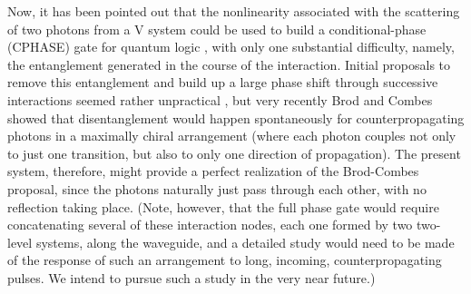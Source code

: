 \documentclass[aps,pra,twocolumn,floatfix,superscriptaddress]{revtex4}
\begin{document}
Now, it has been pointed out that the nonlinearity associated with the scattering of two photons from a V system could be used to build a conditional-phase (CPHASE) gate for quantum logic \cite{chudziki}, with only one substantial difficulty, namely, the entanglement generated in the course of the interaction.  Initial proposals to remove this entanglement and build up a large phase shift through successive interactions seemed rather unpractical \cite{chudziki}, but very recently Brod and Combes \cite{brod2,brod2} showed that disentanglement would happen spontaneously for counterpropagating photons in a maximally chiral arrangement (where each photon couples not only to just one transition, but also to only one direction of propagation).  The present system, therefore, might provide a perfect realization of the Brod-Combes proposal, since the photons naturally just pass through each other, with no reflection taking place. (Note, however, that the full phase gate would require concatenating several of these interaction nodes, each one formed by two two-level systems, along the waveguide, and a detailed study would need to be made of the response of such an arrangement to long, incoming, counterpropagating pulses.  We intend to pursue such a study in the very near future.)
\end{document}
